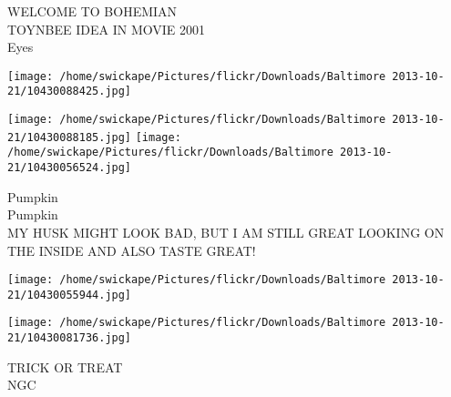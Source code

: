 \documentclass[10pt,letterpaper]{article}
\begin{document}
WELCOME TO BOHEMIAN\\
TOYNBEE IDEA IN MOVIE 2001\\
Eyes\\
\pagebreak

\texttt{[image: /home/swickape/Pictures/flickr/Downloads/Baltimore 2013-10-21/10430088425.jpg]}

\vspace{0.25in}
\texttt{[image: /home/swickape/Pictures/flickr/Downloads/Baltimore 2013-10-21/10430088185.jpg]}
\texttt{[image: /home/swickape/Pictures/flickr/Downloads/Baltimore 2013-10-21/10430056524.jpg]}

Pumpkin\\
Pumpkin\\
MY HUSK MIGHT LOOK BAD, BUT I AM STILL GREAT LOOKING ON THE INSIDE AND ALSO TASTE GREAT!\\
\pagebreak

\texttt{[image: /home/swickape/Pictures/flickr/Downloads/Baltimore 2013-10-21/10430055944.jpg]}

\vspace{0.25in}
\texttt{[image: /home/swickape/Pictures/flickr/Downloads/Baltimore 2013-10-21/10430081736.jpg]}

TRICK OR TREAT\\
NGC\\
\pagebreak
\end{document}
